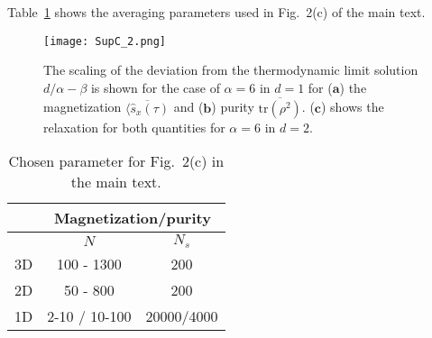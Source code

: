 \documentclass[aps,twocolumn,
superscriptaddress,
footinbib,
prl]{revtex4-1}
\begin{document}
Table~\ref{table1} shows the averaging parameters used in Fig.~2(c) of the main text. 
\begin{figure}
    \texttt{[image: SupC\_2.png]}
    \caption{The scaling of the deviation from the thermodynamic limit solution $d/\alpha - \beta $ is shown for the case of $\alpha=6$ in  $d=1$ for ($\bm{a}$) the magnetization $\overline{\langle \hat{s}_x(\tau)}$ and ($\bm{b}$) purity $\overline{\mathrm{tr}(\rho^{2})}$. ($\bm{c}$) shows the relaxation for both quantities for $\alpha=6$ in $d=2$.} 
    \label{fig:supC}
\end{figure}

\begin{table}[h!]
    \centering
\begin{tabular}{|c|c|c|}
\hline 
    & \multicolumn{2}{|c|}{Magnetization/purity}  \\ \hline
    & $N$ & $N_s$ \\ \hline
    3D & 100 - 1300 & 200  \\
    2D & 50 - 800 & 200\\
    1D & 2-10 / 10-100 & 20000/4000\\ \hline
\end{tabular}
\label{table1}
\caption{Chosen parameter for Fig.~2(c) in the main text.}
\end{table}
 \clearpage
\end{document}
